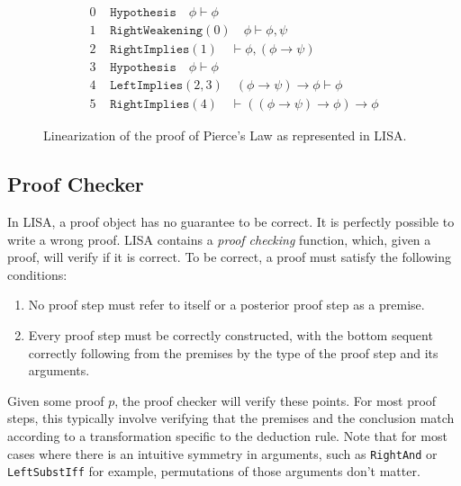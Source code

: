 \begin{figure}

  \begin{equation}
    \begin{split}
      0 &\texttt { Hypothesis} \quad \phi \vdash \phi\\
      1 &\texttt { RightWeakening}(0) \quad  \phi \vdash \phi, \psi\\
      2 &\texttt { RightImplies}(1) \quad  \vdash \phi, (\phi \to \psi)\\
      3 &\texttt { Hypothesis} \quad \phi \vdash \phi\\
      4 &\texttt { LeftImplies}(2,3) \quad (\phi \to \psi) \to \phi \vdash \phi\\
      5 &\texttt { RightImplies}(4) \quad \vdash ((\phi \to \psi) \to \phi) \to \phi
    \end{split}
  \end{equation}
  \caption{Linearization of the proof of Pierce's Law as represented in LISA.}
  \label{fig:exampleProofLinear}
\end{figure}

\subsection{Proof Checker}
\label{subsec:proofchecker}

In LISA, a proof object has no guarantee to be correct. It is perfectly possible to write a wrong proof. LISA contains a \textit{proof checking} function, which, given a proof, will verify if it is correct. To be correct, a proof must satisfy the following conditions:
\begin{enumerate}
  \item No proof step must refer to itself or a posterior proof step as a premise.
  \item Every proof step must be correctly constructed, with the bottom sequent correctly following from the premises by the type of the proof step and its arguments.
\end{enumerate}


Given some proof $p$, the proof checker will verify these points. For most proof steps, this typically involve verifying that the premises and the conclusion match according to a transformation specific to the deduction rule. Note that for most cases where there is an intuitive symmetry in arguments, such as \texttt{RightAnd} or \texttt{LeftSubstIff} for example, permutations of those arguments don't matter.

